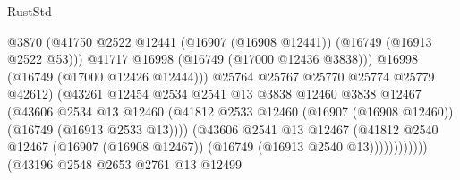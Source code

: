 \begin{lexlean}{RustStd}
\begin{coremodule}
                                              @3870
                                              (@41750
                                                @2522
                                                @12441
                                                (@16907 (@16908 @12441))
                                                (@16749 (@16913 @2522 @53)))
                                              @41717
                                              @16998
                                              (@16749 (@17000 @12436 @3838)))
                                            @16998
                                            (@16749 (@17000 @12426 @12444)))
                                          @25764
                                          @25767
                                          @25770
                                          @25774
                                          @25779
                                          @42612)
                                        (@43261
                                          @12454
                                          @2534
                                          @2541
                                          @13
                                          @3838
                                          @12460
                                          @3838
                                          @12467
                                          (@43606
                                            @2534
                                            @13
                                            @12460
                                            (@41812
                                              @2533
                                              @12460
                                              (@16907 (@16908 @12460))
                                              (@16749 (@16913 @2533 @13))))
                                          (@43606
                                            @2541
                                            @13
                                            @12467
                                            (@41812
                                              @2540
                                              @12467
                                              (@16907 (@16908 @12467))
                                              (@16749 (@16913 @2540 @13))))))))))))
                          (@43196
                            @2548
                            @2653
                            @2761
                            @13
                            @12499

\end{coremodule}
\end{lexlean}
